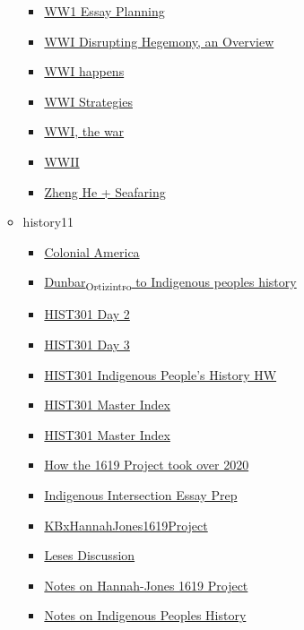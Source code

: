 \documentclass[11pt]{article}
\begin{document}
\begin{itemize}
\begin{itemize}
\begin{itemize}
\item \href{history/history10/KBxWW1EssayPlanning.org}{WW1 Essay Planning}
\item \href{history/history10/KBhHIST201WWI.org}{WWI Disrupting Hegemony, an Overview}
\item \href{history/history10/KBe21hist201floWWIPlaysOut.org}{WWI happens}
\item \href{history/history10/KBhHIST201WWIStrategies.org}{WWI Strategies}
\item \href{history/history10/KBhHIST201WWIActualWar.org}{WWI, the war}
\item \href{history/history10/KBhHIST201WWII.org}{WWII}
\item \href{history/history10/KBhHIST201ZhengHeSeafaring.org}{Zheng He + Seafaring}
\end{itemize}
\item history11
\begin{itemize}
\item \href{history/history11/KBhHIST301ColonialAmerica.org}{Colonial America}
\item \href{history/history11/KBxIndigenousPeoplesHistoftheUS.org}{Dunbar\textsubscript{Ortiz}\textsubscript{intro} to Indigenous peoples history}
\item \href{history/history11/KBdHIST301Day2.org}{HIST301 Day 2}
\item \href{history/history11/KBdHIST301Day3.org}{HIST301 Day 3}
\item \href{history/history11/KBdHIST301HWIndigenousPeoplesHistory.org}{HIST301 Indigenous People's History HW}
\item \href{history/history11/index.org}{HIST301 Master Index}
\item \href{history/history11/KBHIST301MasterIndex.org}{HIST301 Master Index}
\item \href{history/history11/KBx1619ProjectTookOver2020.org}{How the 1619 Project took over 2020}
\item \href{history/history11/KBhIntersectionsEssayPrep.org}{Indigenous Intersection Essay Prep}
\item \href{history/history11/KBxHannahJones1619Project.org}{KBxHannahJones1619Project}
\item \href{history/history11/KBhHIST301Lenses.org}{Leses Discussion}
\item \href{history/history11/KBxNotesonHannahJones.org}{Notes on Hannah-Jones 1619 Project}
\item \href{history/history11/KBxIndigenousPeoplesHistoftheUSNotes.org}{Notes on Indigenous Peoples History}

\end{itemize}
\end{itemize}
\end{itemize}
\end{document}

